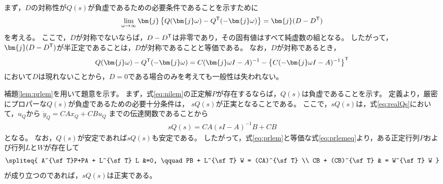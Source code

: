 \documentclass[tombow,dvipdfmx]{corona-a5}
\begin{document}
\begin{証明}
まず，$D$の対称性が$Q(s)$が負虚であるための必要条件であることを示すために
\begin{align*}
\lim_{\omega \rightarrow \infty} 
\bm{j}\left\{Q(\bm{j} \omega) - Q^{\sf T}(-\bm{j} \omega) \right\}
= \bm{j} (D - D^{\sf T})
\end{align*}
を考える。
ここで，$D$が対称でないならば，$D - D^{\sf T}$は非零であり，その固有値はすべて純虚数の組となる。
したがって，$\bm{j} (D - D^{\sf T})$が半正定であることは，$D$が対称であることと等価である。
なお，$D$が対称であるとき，
\begin{align*}
Q(\bm{j} \omega) - Q^{\sf T}(-\bm{j} \omega) = 
C(\bm{j} \omega I -A)^{-1} - \left\{ C( -\bm{j} \omega I -A)^{-1} \right\}^{\sf T}
\end{align*}
において$D$は現れないことから，$D=0$である場合のみを考えても一般性は失われない。

補題\ref{lem:prlem}を用いて題意を示す。
まず，式\ref{eq:nilem}の正定解$P$が存在するならば，$Q(s)$は負虚であることを示す。
定義より，厳密にプロパーな$Q(s)$が負虚であるための必要十分条件は，
$sQ(s)$が正実となることである。
ここで，$sQ(s)$は，式\ref{eq:realQs}において，$u_{Q}$から
$
\dot{y}_Q = CA x_Q + CB u_Q
$
までの伝達関数であることから
\begin{align}\label{eq:sQs}
sQ(s) = CA (sI - A)^{-1}B + CB
\end{align}
となる。
なお，$Q(s)$が安定であれば$sQ(s)$も安定である。
したがって，式\ref{eq:prlem}と等価な式\ref{eq:prlemeq}より，ある正定行列$P$および行列$L$と$W$が存在して
\begin{align}\label{eq:nicLW}
\spliteq{
A^{\sf T}P+PA + L^{\sf T} L &=0,
\qquad
PB + L^{\sf T} W = (CA)^{\sf T}
\\
CB + (CB)^{\sf T} & = W^{\sf T} W
}
\end{align}
が成り立つのであれば，$sQ(s)$は正実である。


\end{証明}
\end{document}
